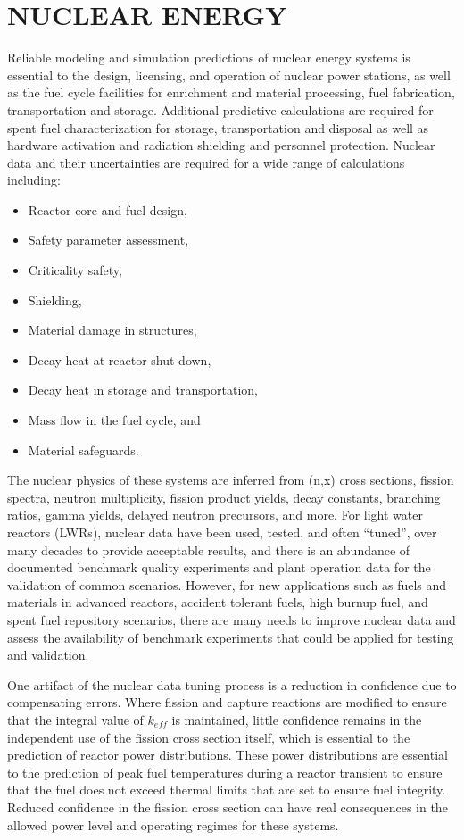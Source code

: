 \documentclass[letterpaper]{ar-1col}
\begin{document}
\section{NUCLEAR ENERGY}

Reliable modeling and simulation predictions of nuclear energy systems is essential to the design, licensing, and operation of nuclear power stations, as well as the fuel cycle facilities for enrichment and material processing, fuel fabrication, transportation and storage.
Additional predictive calculations are required for spent fuel characterization for storage, transportation and disposal as well as hardware activation and radiation shielding and personnel protection.
Nuclear data and their uncertainties are required for a wide range of calculations including:
\begin{itemize}
  \item Reactor core and fuel design,
  \item Safety parameter assessment,
  \item Criticality safety,
  \item Shielding,
  \item Material damage in structures,
  \item Decay heat at reactor shut-down,
  \item Decay heat in storage and transportation,
  \item Mass flow in the fuel cycle, and
  \item Material safeguards.
\end{itemize}

The nuclear physics of these systems are inferred from (n,x) cross sections, fission spectra, neutron multiplicity, fission product yields, decay constants, branching ratios, gamma yields, delayed neutron precursors, and more.
 For light water reactors (LWRs), nuclear data have been used, tested, and often \enquote{tuned}, over many decades to provide acceptable results, and there is an abundance of documented benchmark quality experiments and plant operation data for the validation of common scenarios.
However, for new applications such as fuels and materials in advanced reactors, accident tolerant fuels, high burnup fuel, and spent fuel repository scenarios, there are many needs to improve nuclear data and assess the availability of benchmark experiments that could be applied for testing and validation.


One artifact of the nuclear data tuning process is a reduction in confidence due to compensating errors.
Where fission and capture reactions are modified to ensure that the integral value of $k_{eff}$ is maintained, little confidence remains in the independent use of the fission cross section itself, which is essential to the prediction of reactor power distributions.
These power distributions are essential to the prediction of peak fuel temperatures during a reactor transient to ensure that the fuel does not exceed thermal limits that are set to ensure fuel integrity.
Reduced confidence in the fission cross section can have real consequences in the allowed power level and operating regimes for these systems.
\end{document}
